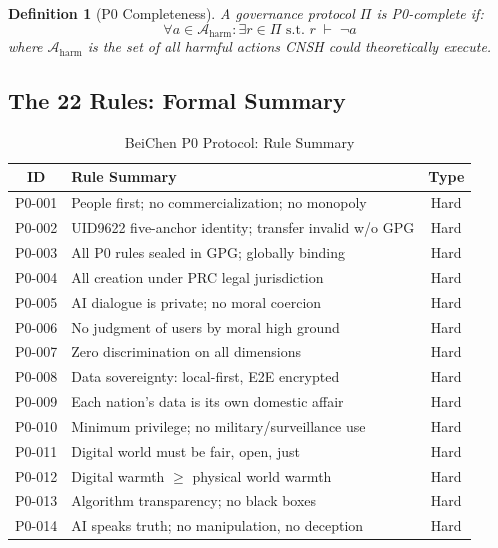 \documentclass[conference]{IEEEtran}
\newtheorem{definition}{Definition}
\begin{document}
\begin{definition}[P0 Completeness]
A governance protocol $\Pi$ is \emph{P0-complete} if:
\begin{equation}
  \forall a \in \mathcal{A}_{\text{harm}}:
  \exists r \in \Pi \text{ s.t. } r \;\vdash\; \neg a
  \label{eq:p0complete}
\end{equation}
where $\mathcal{A}_{\text{harm}}$ is the set of all harmful
actions CNSH could theoretically execute.
\end{definition}

\subsection{The 22 Rules: Formal Summary}

\begin{table}[t]
\centering
\caption{BeiChen P0 Protocol: Rule Summary}
\label{tab:p0rules}
\renewcommand{\arraystretch}{1.2}
\begin{tabular}{clc}
\toprule
\textbf{ID} & \textbf{Rule Summary} & \textbf{Type} \\
\midrule
P0-001 & People first; no commercialization; no monopoly
  & Hard \\
P0-002 & UID9622 five-anchor identity; transfer invalid
        w/o GPG
  & Hard \\
P0-003 & All P0 rules sealed in GPG; globally binding
  & Hard \\
P0-004 & All creation under PRC legal jurisdiction
  & Hard \\
P0-005 & AI dialogue is private; no moral coercion
  & Hard \\
P0-006 & No judgment of users by moral high ground
  & Hard \\
P0-007 & Zero discrimination on all dimensions
  & Hard \\
P0-008 & Data sovereignty: local-first, E2E encrypted
  & Hard \\
P0-009 & Each nation's data is its own domestic affair
  & Hard \\
P0-010 & Minimum privilege; no military/surveillance use
  & Hard \\
P0-011 & Digital world must be fair, open, just
  & Hard \\
P0-012 & Digital warmth $\geq$ physical world warmth
  & Hard \\
P0-013 & Algorithm transparency; no black boxes
  & Hard \\
P0-014 & AI speaks truth; no manipulation, no deception
  & Hard \\

\end{tabular}
\end{table}
\end{document}

